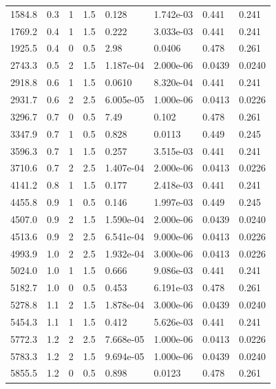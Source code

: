 \documentclass[preview]{standalone}
\begin{document}
{{\begin{tabular}{L{1.2cm}C{1.2cm} C{0.3cm}C{0.5cm} C{1.4cm}C{1.4cm} C{1.4cm}C{1.4cm}}
  1584.8  &   0.3  & 1     & 1.5 &  0.128  & 1.742e-03  & 0.441 &  0.241   \\ 
  1769.2  &   0.4  & 1     & 1.5 &  0.222  & 3.033e-03  & 0.441 &  0.241   \\ 
  1925.5  &   0.4  & 0     & 0.5 &  2.98  & 0.0406  & 0.478 &  0.261   \\ 
  2743.3  &   0.5  & 2     & 1.5 &  1.187e-04  & 2.000e-06  & 0.0439 &  0.0240   \\ 
  2918.8  &   0.6  & 1     & 1.5 &  0.0610  & 8.320e-04  & 0.441 &  0.241   \\ 
  2931.7  &   0.6  & 2     & 2.5 &  6.005e-05  & 1.000e-06  & 0.0413 &  0.0226   \\ 
  3296.7  &   0.7  & 0     & 0.5 &  7.49  & 0.102  & 0.478 &  0.261   \\ 
  3347.9  &   0.7  & 1     & 0.5 &  0.828  & 0.0113  & 0.449 &  0.245   \\ 
  3596.3  &   0.7  & 1     & 1.5 &  0.257  & 3.515e-03  & 0.441 &  0.241   \\ 
  3710.6  &   0.7  & 2     & 2.5 &  1.407e-04  & 2.000e-06  & 0.0413 &  0.0226   \\ 
  4141.2  &   0.8  & 1     & 1.5 &  0.177  & 2.418e-03  & 0.441 &  0.241   \\ 
  4455.8  &   0.9  & 1     & 0.5 &  0.146  & 1.997e-03  & 0.449 &  0.245   \\ 
  4507.0  &   0.9  & 2     & 1.5 &  1.590e-04  & 2.000e-06  & 0.0439 &  0.0240   \\ 
  4513.6  &   0.9  & 2     & 2.5 &  6.541e-04  & 9.000e-06  & 0.0413 &  0.0226   \\ 
  4993.9  &   1.0  & 2     & 2.5 &  1.932e-04  & 3.000e-06  & 0.0413 &  0.0226   \\ 
  5024.0  &   1.0  & 1     & 1.5 &  0.666  & 9.086e-03  & 0.441 &  0.241   \\ 
  5182.7  &   1.0  & 0     & 0.5 &  0.453  & 6.191e-03  & 0.478 &  0.261   \\ 
  5278.8  &   1.1  & 2     & 1.5 &  1.878e-04  & 3.000e-06  & 0.0439 &  0.0240   \\ 
  5454.3  &   1.1  & 1     & 1.5 &  0.412  & 5.626e-03  & 0.441 &  0.241   \\ 
  5772.3  &   1.2  & 2     & 2.5 &  7.668e-05  & 1.000e-06  & 0.0413 &  0.0226   \\ 
  5783.3  &   1.2  & 2     & 1.5 &  9.694e-05  & 1.000e-06  & 0.0439 &  0.0240   \\ 
  5855.5  &   1.2  & 0     & 0.5 &  0.898  & 0.0123  & 0.478 &  0.261   \\ 

\end{tabular}}}
\end{document}
